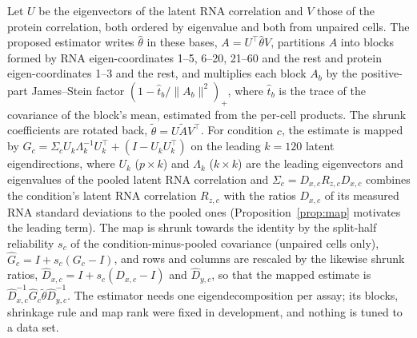 Let $U$ be the eigenvectors of the latent RNA correlation and $V$ those of the protein correlation, both ordered by eigenvalue and both from unpaired cells. The proposed estimator writes $\hat\theta$ in these bases, $A=U^\top\hat\theta V$, partitions $A$ into blocks formed by RNA eigen-coordinates 1--5, 6--20, 21--60 and the rest and protein eigen-coordinates 1--3 and the rest, and multiplies each block $A_b$ by the positive-part James--Stein factor\cite{james1961,baranchik1970} $(1-\hat t_b/\|A_b\|^2)_+$, where $\hat t_b$ is the trace of the covariance of the block's mean, estimated from the per-cell products. The shrunk coefficients are rotated back, $\tilde\theta=U\tilde AV^\top$. For condition $c$, the estimate is mapped by $G_c=\Sigma_{c}U_k\Lambda_k^{-1}U_k^\top+(I-U_kU_k^\top)$ on the leading $k=120$ latent eigendirections, where $U_k$ ($p\times k$) and $\Lambda_k$ ($k\times k$) are the leading eigenvectors and eigenvalues of the pooled latent RNA correlation and $\Sigma_c=D_{x,c}R_{z,c}D_{x,c}$ combines the condition's latent RNA correlation $R_{z,c}$ with the ratios $D_{x,c}$ of its measured RNA standard deviations to the pooled ones (Proposition~\ref{prop:map} motivates the leading term). The map is shrunk towards the identity by the split-half reliability $s_c$ of the condition-minus-pooled covariance (unpaired cells only), $\hat G_c=I+s_c(G_c-I)$, and rows and columns are rescaled by the likewise shrunk ratios, $\hat D_{x,c}=I+s_c(D_{x,c}-I)$ and $\hat D_{y,c}$, so that the mapped estimate is $\hat D_{x,c}^{-1}\hat G_c\tilde\theta\hat D_{y,c}^{-1}$. The estimator needs one eigendecomposition per assay; its blocks, shrinkage rule and map rank were fixed in development, and nothing is tuned to a data set.

